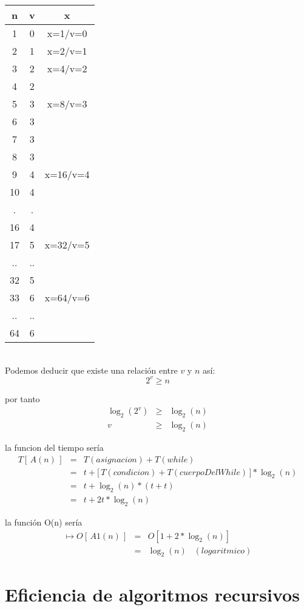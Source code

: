 \begin{enumerate}
\begin{tabular}{c|c|c}
n & v & x \\ \hline
1 & 0 & x=1/v=0 \\
2 & 1 & x=2/v=1 \\
3 & 2 & x=4/v=2 \\
4 & 2 &  \\
5 & 3 & x=8/v=3 \\
6 & 3 &  \\
7 & 3 &  \\
8 & 3 &  \\ 
9 & 4 & x=16/v=4 \\
10 & 4 &  \\
. & . &  \\
16 & 4 &  \\
17 & 5 & x=32/v=5 \\ 
.. & .. &  \\
32 & 5 &  \\ 
33 & 6 & x=64/v=6 \\
.. & .. &  \\ 
64 & 6 &   \\ 
\end{tabular}
\\[.5cm]
Podemos deducir que existe una relación entre $v$ y $n$ así:
$$2^v \geq  n$$

por tanto
\begin{eqnarray*}
  \log_2(2^v) &\geq&\log_2(n)\\
  v&\geq&\log_2(n)
\end{eqnarray*}

la funcion del tiempo sería
\begin{eqnarray*}
  T[\,A(n)\,] &=& T(asignacion) + T(while)\\
  &=& t +  \bigl[\, T(condicion) + T(cuerpoDelWhile) \, \bigr] * \log_2(n)\\
  &=& t + \log_2(n)*(t + t )\\
  &=& t + 2t*\log_2(n)
\end{eqnarray*}

la función O(n) sería
\begin{eqnarray*}
  \mapsto O[\,A1(n)\,] &=& O[1 + 2*\log_2(n) ]\\
  &=& \log_2(n) \;\;\;    (logaritmico)
\end{eqnarray*}

\end{enumerate}

\section{ Eficiencia de algoritmos recursivos }
\label{sec:efic-de-algor-2}

